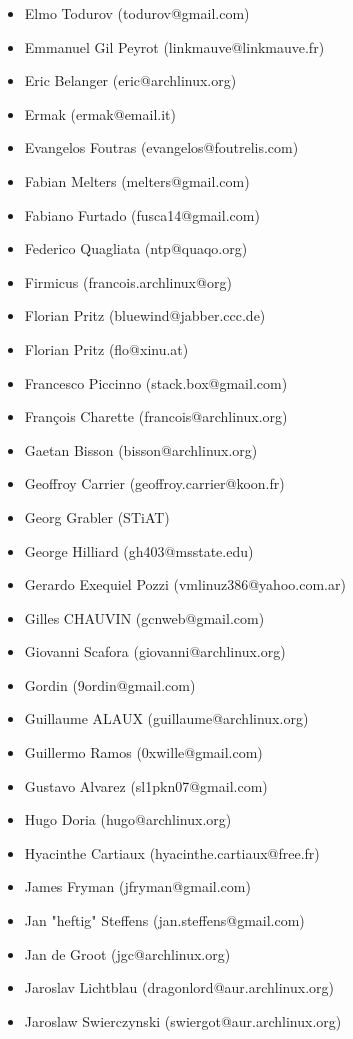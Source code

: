 \begin{itemize}
\item  Elmo Todurov (todurov@gmail.com)
\item  Emmanuel Gil Peyrot (linkmauve@linkmauve.fr)
\item  Eric Belanger (eric@archlinux.org)
\item  Ermak (ermak@email.it)
\item  Evangelos Foutras (evangelos@foutrelis.com)
\item  Fabian Melters (melters@gmail.com)
\item  Fabiano Furtado (fusca14@gmail.com)
\item  Federico Quagliata (ntp@quaqo.org)
\item  Firmicus (francois.archlinux@org)
\item  Florian Pritz (bluewind@jabber.ccc.de)
\item  Florian Pritz (flo@xinu.at)
\item  Francesco Piccinno (stack.box@gmail.com)
\item  François Charette (francois@archlinux.org)
\item  Gaetan Bisson (bisson@archlinux.org)
\item  Geoffroy Carrier (geoffroy.carrier@koon.fr)
\item  Georg Grabler (STiAT)
\item  George Hilliard (gh403@msstate.edu)
\item  Gerardo Exequiel Pozzi (vmlinuz386@yahoo.com.ar)
\item  Gilles CHAUVIN (gcnweb@gmail.com)
\item  Giovanni Scafora (giovanni@archlinux.org)
\item  Gordin (9ordin@gmail.com)
\item  Guillaume ALAUX (guillaume@archlinux.org)
\item  Guillermo Ramos (0xwille@gmail.com)
\item  Gustavo Alvarez (sl1pkn07@gmail.com)
\item  Hugo Doria (hugo@archlinux.org)
\item  Hyacinthe Cartiaux (hyacinthe.cartiaux@free.fr)
\item  James Fryman (jfryman@gmail.com)
\item  Jan "heftig" Steffens (jan.steffens@gmail.com)
\item  Jan de Groot (jgc@archlinux.org)
\item  Jaroslav Lichtblau (dragonlord@aur.archlinux.org)
\item  Jaroslaw Swierczynski (swiergot@aur.archlinux.org)

\end{itemize}

